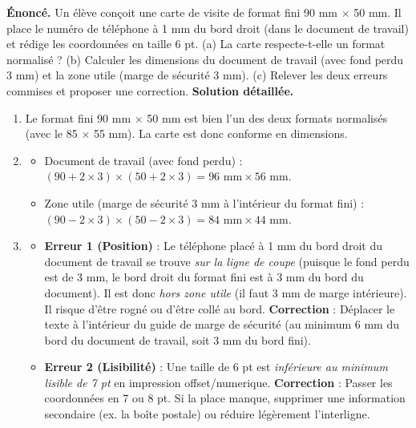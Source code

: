 \documentclass[11pt]{article}
\begin{document}
\begin{exoresolu}
\textbf{Énoncé.} Un élève conçoit une carte de visite de format fini 90 mm $\times$ 50 mm. Il place le numéro de téléphone à 1 mm du bord droit (dans le document de travail) et rédige les coordonnées en taille 6 pt. (a) La carte respecte-t-elle un format normalisé ? (b) Calculer les dimensions du document de travail (avec fond perdu 3 mm) et la zone utile (marge de sécurité 3 mm). (c) Relever les deux erreurs commises et proposer une correction.
\tcblower
\textbf{Solution détaillée.}
\begin{enumerate}
\item[(a)] Le format fini 90 mm $\times$ 50 mm est bien l'un des deux formats normalisés (avec le 85 $\times$ 55 mm). La carte est donc conforme en dimensions.
\item[(b)] 
\begin{itemize}
\item Document de travail (avec fond perdu) : $(90 + 2\times3) \times (50 + 2\times3) = 96 \text{ mm} \times 56 \text{ mm}$.
\item Zone utile (marge de sécurité 3 mm à l'intérieur du format fini) : $(90 - 2\times3) \times (50 - 2\times3) = 84 \text{ mm} \times 44 \text{ mm}$.
\end{itemize}
\item[(c)] 
\begin{itemize}
\item \textbf{Erreur 1 (Position)} : Le téléphone placé à 1 mm du bord droit du document de travail se trouve \emph{sur la ligne de coupe} (puisque le fond perdu est de 3 mm, le bord droit du format fini est à 3 mm du bord du document). Il est donc \emph{hors zone utile} (il faut 3 mm de marge intérieure). Il risque d'être rogné ou d'être collé au bord. \textbf{Correction} : Déplacer le texte à l'intérieur du guide de marge de sécurité (au minimum 6 mm du bord du document de travail, soit 3 mm du bord fini).
\item \textbf{Erreur 2 (Lisibilité)} : Une taille de 6 pt est \emph{inférieure au minimum lisible de 7 pt} en impression offset/numerique. \textbf{Correction} : Passer les coordonnées en 7 ou 8 pt. Si la place manque, supprimer une information secondaire (ex. la boîte postale) ou réduire légèrement l'interligne.
\end{itemize}
\end{enumerate}
\end{exoresolu}
\end{document}
